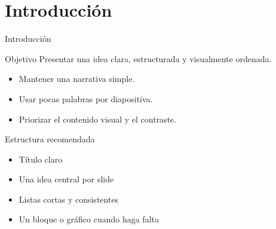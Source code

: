 \section{Introducción}

\begin{frame}{Introducción}
  \begin{block}{Objetivo}
    Presentar una idea clara, estructurada y visualmente ordenada.
  \end{block}

  \vspace{0.3cm}
  \begin{itemize}
    
    \item Mantener una narrativa simple.
    \item Usar pocas palabras por diapositiva.
    \item Priorizar el contenido visual y el contraste.
  \end{itemize}
\end{frame}

\begin{frame}{Estructura recomendada}
  \begin{itemize}
    \item Título claro
    \item Una idea central por slide
    \item Listas cortas y consistentes
    \item Un bloque o gráfico cuando haga falta
  \end{itemize}
\end{frame}
